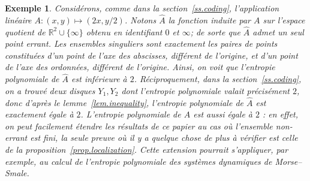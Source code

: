 \documentclass[11pt]{article}
\newtheorem*{exam*}{Exemple}
\theoremstyle{definition}
\numberwithin{equation}{section}
\numberwithin{figure}{section}
\numberwithin{table}{section}
\newcommand{\bbR}{{\mathbb{R}}}
\let\hat\widehat
\begin{document}
\begin{exam*}
Considérons, comme dans la section~\ref{ss.coding}, {l'application linéaire} $A : (x,y) \mapsto (2x, y/2)$. Notons $\hat A$ la fonction induite par $A$ sur l'espace quotient de $\bbR^2 \cup\{\infty\}$ obtenu en identifiant $0$ et $\infty$; de sorte que $\hat A$ admet un seul point errant. Les ensembles singuliers sont exactement les paires de points constituées d'un point de l'axe des abscisses, différent de l'origine, et d'un point de l'axe des ordonnées, différent de l'origine. Ainsi, on voit que l'entropie polynomiale de $\hat A$ est inférieure à $2$. Réciproquement, dans la section~\ref{ss.coding}, on a trouvé deux disques $Y_1, Y_2$ dont l'entropie polynomiale valait précisément $2$, donc d'après le lemme~\ref{lem.inequality}, l'entropie polynomiale de $\hat A$ est exactement égale à $2$. L'entropie polynomiale de $A$ est aussi égale à $2$ : en effet, on peut facilement étendre les résultats de ce papier au cas où l'ensemble non-errant est fini, la seule preuve où il y a quelque chose de plus à vérifier est celle de la proposition~\ref{prop.localization}. Cette extension pourrait s'appliquer, par exemple, au calcul de l'entropie polynomiale des systèmes dynamiques de Morse--Smale.
\end{exam*}
\end{document}
